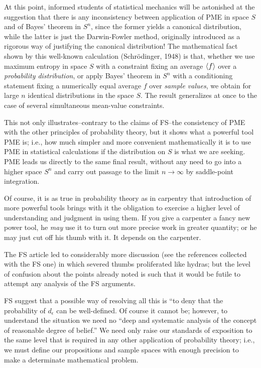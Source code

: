 At this point, informed students of statistical mechanics will be astonished at the suggestion that there is any inconsistency between application of PME in space $S$ and of Bayes’ theorem in $S^n$, since the former yields a canonical distribution, while the latter is just the Darwin-Fowler method, originally introduced as a rigorous way of justifying the canonical distribution!
The mathematical fact shown by this well-known calculation (Schrödinger, \cite{schrodinger}{1948}) is that, whether we use maximum entropy in space $S$ with a constraint fixing an average $\langle f\rangle$ over a \emph{probability distribution}, or apply Bayes' theorem in $S^n$ with a conditioning statement fixing a numerically equal average $f$ over \emph{sample values}, we obtain for large $n$ identical distributions in the space $S$.
The result generalizes at once to the case of several simultaneous mean-value constraints.

This not only illustrates--contrary to the claims of \cite{friedman}{FS}--the consistency of PME with the other principles of probability theory, but it shows what a powerful tool PME is; i.e., how much simpler and more convenient mathematically it is to use PME in statistical calculations if the distribution on $S$ is what we are seeking.
PME leads us directly to the same final result, without any need to go into a higher space $S^n$ and carry out passage to the limit $n\to\infty$ by saddle-point integration.

Of course, it is as true in probability theory as in carpentry that introduction of more powerful tools brings with it the obligation to exercise a higher level of understanding and judgment in using them.
If you give a carpenter a fancy new power tool, he \emph{may} use it to turn out more precise work in greater quantity; or he may just cut off his thumb with it.
It depends on the carpenter.

The \cite{friedman}{FS} article led to considerably more discussion (see the references collected with the \cite{friedman}{FS} one) in which severed thumbs proliferated like hydras; but the level of confusion about the points already noted is such that it would be futile to attempt any analysis of the \cite{friedman}{FS} arguments.

\cite{friedman}{FS} suggest that a possible way of resolving all this is ``to deny that the probability of $d_\epsilon$ can be well-defined.
Of course it cannot be; however, to understand the situation we need no ``deep and systematic analysis of the concept of reasonable degree of belief.''
We need only raise our standards of exposition to the same level that is required in any other application of probability theory; i.e., we must define our propositions and sample spaces with enough precision to make a determinate mathematical problem.

